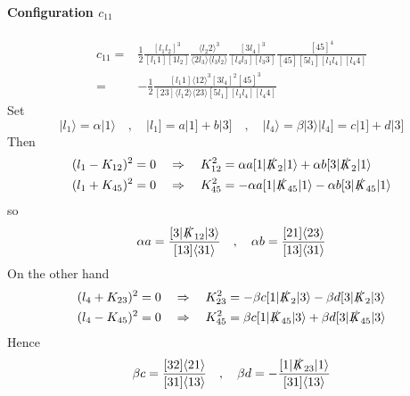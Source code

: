 \paragraph{Configuration $c_{11}$}
\begin{equation}
\begin{split}
c_{11} = &
\frac{1}{2}\frac{[l_1 l_2]^3}{[l_1 1][1l_2]}
\frac{\langle l_2 2 \rangle^3}{\langle 2 l_3 \rangle\langle l_3 l_2 \rangle}
\frac{[3l_4]^3}{[l_4 l_3][l_3 3]}
\frac{[45]^4}{[45][5l_1][l_1l_4][l_4 4]}
\\
= &
-\frac{1}{2}
\frac{[l_1 1]\langle 12 \rangle^3[3l_4]^2[45]^3}{[23]\langle l_1 2 \rangle\langle 23 \rangle[5l_1][l_1l_4][l_4 4]}
\end{split}
\end{equation}
%
Set
\begin{equation}
|l_1\rangle = \alpha| 1\rangle \quad,\quad
|l_1] = a|1] + b|3] \quad,\quad
|l_4\rangle = \beta|3\rangle 
| l_4] = c|1] + d|3]
\end{equation}
Then
\begin{equation}
\begin{split}
& (l_1- K_{12})^2 = 0 \quad\Rightarrow\quad K_{12}^2 = \alpha a [1|\slashed{K}_2|1\rangle + \alpha b [3|\slashed{K}_2|1\rangle
\\
& (l_1 + K_{45})^2 = 0 \quad\Rightarrow\quad
K_{45}^2 = -\alpha a [1|\slashed{K}_{45}|1\rangle - \alpha b [3|\slashed{K}_{45}|1\rangle
\end{split}
\end{equation}
so
\begin{equation}
\alpha a = \frac{[3|\slashed{K}_{12}|3\rangle}{[13]\langle 31\rangle}
\quad,\quad
\alpha b = \frac{[21]\langle 23\rangle}{[13]\langle 31\rangle}
\end{equation}
On the other hand
\begin{equation}
\begin{split}
& (l_4 + K_{23})^2 = 0 \quad\Rightarrow\quad K_{23}^2 = -\beta c[1|\slashed{K}_2|3\rangle - \beta d [3|\slashed{K}_2|3\rangle
\\
& (l_4 - K_{45})^2 = 0 \quad\Rightarrow\quad K_{45}^2 = \beta c [1|\slashed{K}_{45}|3\rangle + \beta d [3|\slashed{K}_{45}|3\rangle
\end{split}
\end{equation}
Hence
\begin{equation}
\beta c = \frac{[32]\langle 21\rangle}{[31]\langle 13\rangle}
\quad,\quad
\beta d = -\frac{[1|\slashed{K}_{23}|1\rangle}{[31]\langle 13\rangle}
\end{equation}
